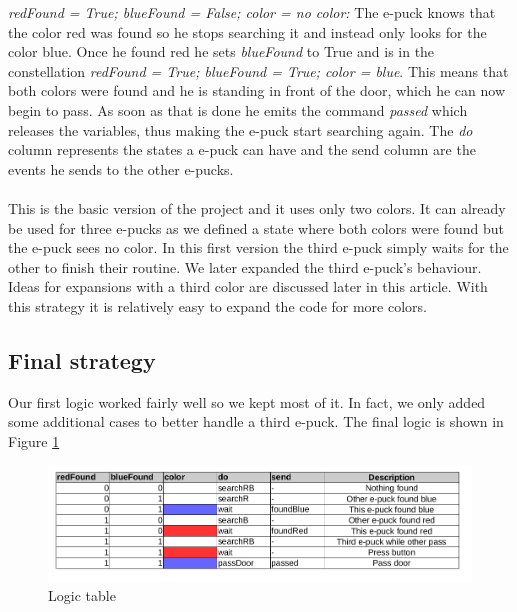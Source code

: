 \documentclass[12pt,a4paper]{article}
\begin{document}
\noindent \textit{redFound = True; blueFound = False; color = no color:} The e-puck knows that the color red was found so he stops searching it and instead only looks for the color blue. 
Once he found red he sets \textit{blueFound} to True and is in the constellation \textit{redFound = True; blueFound = True; color = blue}. This means that both colors were found and he is standing in front of the door, which he can now begin to pass. As soon as that is done he emits the command \textit{passed} which releases the variables, thus making the e-puck start searching again. 
The \textit{do} column represents the states a e-puck can have and the send column are the events he sends to the other e-pucks.\\ \\
This is the basic version of the project and it uses only two colors. It can already be used for three e-pucks as we defined a state where both colors were found but the e-puck sees no color. In this first version the third e-puck simply waits for the other to finish their routine. We later expanded the third e-puck's behaviour. Ideas for expansions with a third color are discussed later in this article. With this strategy it is relatively easy to expand the code for more colors. 

\subsection{Final strategy}
Our first logic worked fairly well so we kept most of it. In fact, we only added some additional cases to better handle a third e-puck. The final logic is shown in Figure \ref{fig:logic table}

\begin{figure}[h!]
\begin{center}
\includegraphics[scale=0.5]{images/LogicTable.png}
\caption{Logic table}
\label{fig:logic table}
\end{center}
\end{figure}
\end{document}
